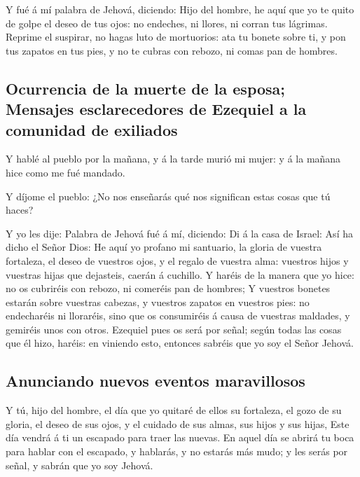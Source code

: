  Y fué á mí palabra de Jehová, diciendo:  Hijo
del hombre, he aquí que yo te quito de golpe el deseo de tus ojos: no
endeches, ni llores, ni corran tus lágrimas.  Reprime el
suspirar, no hagas luto de mortuorios: ata tu bonete sobre ti, y pon tus
zapatos en tus pies, y no te cubras con rebozo, ni comas pan de hombres.

\hypertarget{ocurrencia-de-la-muerte-de-la-esposa-mensajes-esclarecedores-de-ezequiel-a-la-comunidad-de-exiliados}{%
\subsection{Ocurrencia de la muerte de la esposa; Mensajes
esclarecedores de Ezequiel a la comunidad de
exiliados}\label{ocurrencia-de-la-muerte-de-la-esposa-mensajes-esclarecedores-de-ezequiel-a-la-comunidad-de-exiliados}}

 Y hablé al pueblo por la mañana, y á la tarde murió mi
mujer: y á la mañana hice como me fué mandado.

 Y díjome el pueblo: ¿No nos enseñarás qué nos significan
estas cosas que tú haces?

 Y yo les dije: Palabra de Jehová fué á mí, diciendo:
 Di á la casa de Israel: Así ha dicho el Señor Dios: He
aquí yo profano mi santuario, la gloria de vuestra fortaleza, el deseo
de vuestros ojos, y el regalo de vuestra alma: vuestros hijos y vuestras
hijas que dejasteis, caerán á cuchillo.  Y haréis de la
manera que yo hice: no os cubriréis con rebozo, ni comeréis pan de
hombres;  Y vuestros bonetes estarán sobre vuestras
cabezas, y vuestros zapatos en vuestros pies: no endecharéis ni
lloraréis, sino que os consumiréis á causa de vuestras maldades, y
gemiréis unos con otros.  Ezequiel pues os será por señal;
según todas las cosas que él hizo, haréis: en viniendo esto, entonces
sabréis que yo soy el Señor Jehová.

\hypertarget{anunciando-nuevos-eventos-maravillosos}{%
\subsection{Anunciando nuevos eventos
maravillosos}\label{anunciando-nuevos-eventos-maravillosos}}

 Y tú, hijo del hombre, el día que yo quitaré de ellos su
fortaleza, el gozo de su gloria, el deseo de sus ojos, y el cuidado de
sus almas, sus hijos y sus hijas,  Este día vendrá á ti un
escapado para traer las nuevas.  En aquel día se abrirá tu
boca para hablar con el escapado, y hablarás, y no estarás más mudo; y
les serás por señal, y sabrán que yo soy Jehová.

